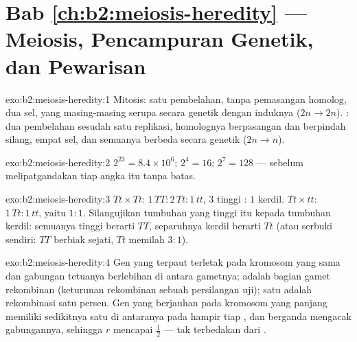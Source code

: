 \section*{Bab \ref{ch:b2:meiosis-heredity} --- Meiosis, Pencampuran Genetik, dan Pewarisan}

\begin{solution}{exo:b2:meiosis-heredity:1}
Mitosis: satu pembelahan, tanpa pemasangan homolog, dua sel, yang
masing-masing serupa secara genetik dengan induknya ($2n \to 2n$).
: dua pembelahan sesudah satu replikasi, homolognya berpasangan
dan berpindah silang, empat sel,  dan semuanya berbeda secara
genetik ($2n \to n$).
\end{solution}

\begin{solution}{exo:b2:meiosis-heredity:2}
$2^{23} = 8.4\times 10^{6}$; $2^{4} = 16$; $2^{7} = 128$ --- sebelum
 melipatgandakan tiap angka itu tanpa batas.
\end{solution}

\begin{solution}{exo:b2:meiosis-heredity:3}
$Tt\times Tt$:  $1\,TT : 2\,Tt : 1\,tt$,  $3$ tinggi
: $1$ kerdil. $Tt\times tt$: $1\,Tt : 1\,tt$, yaitu $1 : 1$.
Silangujikan tumbuhan yang tinggi itu kepada tumbuhan kerdil: semuanya
tinggi berarti $TT$, separuhnya kerdil berarti $Tt$ (atau serbuki
sendiri: $TT$ berbiak sejati, $Tt$ memilah $3 : 1$).
\end{solution}

\begin{solution}{exo:b2:meiosis-heredity:4}
Gen yang terpaut terletak pada kromosom yang sama dan gabungan 
tetuanya berlebihan di antara gametnya; 
adalah bagian gamet rekombinan (keturunan rekombinan sebuah persilangan
uji); satu  adalah rekombinasi satu persen.
Gen yang berjauhan pada kromosom yang panjang memiliki sedikitnya satu
 di antaranya pada hampir tiap , dan 
berganda mengacak gabungannya, sehingga $r$ mencapai $\tfrac12$ ---
tak terbedakan dari .
\end{solution}


